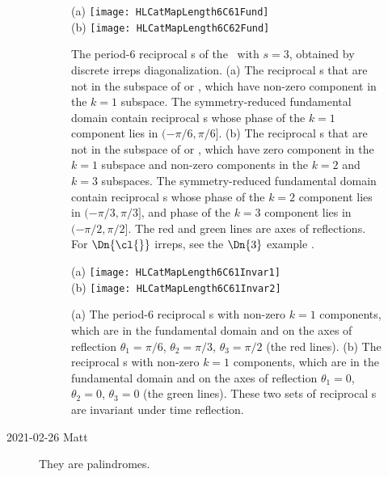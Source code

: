 \begin{description}
\begin{figure}
  \centering
{(a)} %
\texttt{[image: HLCatMapLength6C61Fund]}
\\
{(b)} %
\texttt{[image: HLCatMapLength6C62Fund]}
  \caption{\label{fig:HLCatMapLength6C6Fund}
The period-6 reciprocal {\lattstate}s
of the \templatt\ with $s=3$, obtained by discrete  irreps
diagonalization.
(a)
The reciprocal {\lattstate}s that are not in the subspace of  or , which have non-zero
component in the $k=1$ subspace. The symmetry-reduced fundamental domain contain
reciprocal {\lattstate}s whose phase of the $k=1$ component lies in $(-\pi/6,\pi/6]$.
(b)
The reciprocal {\lattstate}s that are not in the subspace of  or , which have zero
component in the $k=1$ subspace and non-zero components in the $k=2$ and $k=3$
subspaces.
The symmetry-reduced fundamental domain contain
reciprocal {\lattstate}s whose phase of the $k=2$ component lies in $(-\pi/3,\pi/3]$, and
phase of the $k=3$ component lies in $(-\pi/2,\pi/2]$.
The red and green lines are axes of reflections.
For $\Dn{\cl{}}$ irreps, see the $\Dn{3}$ example
.
          }
\end{figure}

\begin{figure}
  \centering
{(a)} %
\texttt{[image: HLCatMapLength6C61Invar1]}
\\
{(b)} %
\texttt{[image: HLCatMapLength6C61Invar2]}
  \caption{\label{fig:HLCatMapLength6C61Invar}
(a) The period-6  reciprocal {\lattstate}s with non-zero $k=1$ components,
which are in the fundamental domain and on the axes of reflection
$\theta_1=\pi/6$, $\theta_2=\pi/3$, $\theta_3=\pi/2$ (the red lines).
(b)
The reciprocal {\lattstate}s with non-zero $k=1$ components,
which are in the fundamental domain and
on the axes of reflection
$\theta_1=0$, $\theta_2=0$, $\theta_3=0$ (the green lines).
These two sets of reciprocal {\lattstate}s are invariant under time
reflection.
          }
\end{figure}

    \item[2021-02-26 Matt]
They are palindromes.


\end{description}
